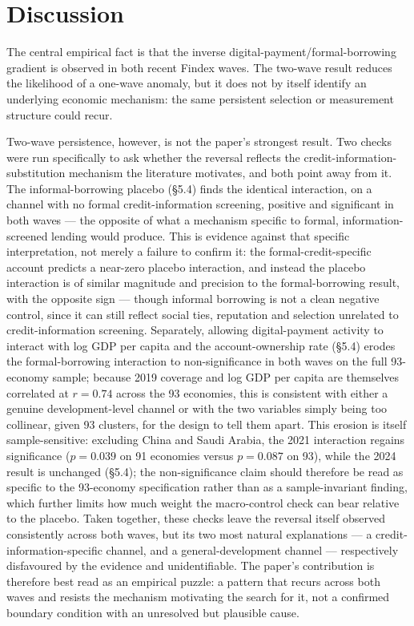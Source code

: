 

\section{Discussion}

The central empirical fact is that the inverse digital-payment/formal-borrowing gradient is
observed in both recent Findex waves. The two-wave result reduces the likelihood of a
one-wave anomaly, but it does not by itself identify an underlying economic mechanism: the
same persistent selection or measurement structure could recur.

Two-wave persistence, however, is not the paper's strongest result. Two checks were run
specifically to ask whether the reversal reflects the credit-information-substitution
mechanism the literature motivates, and both point away from it. The informal-borrowing
placebo (\S5.4) finds the identical interaction, on a channel with no formal
credit-information screening, positive and significant in both waves --- the opposite of
what a mechanism specific to formal, information-screened lending would produce. This is
evidence against that specific interpretation, not merely a failure to confirm it: the
formal-credit-specific account predicts a near-zero placebo interaction, and instead the
placebo interaction is of similar magnitude and precision to the formal-borrowing result,
with the opposite sign --- though informal borrowing is not a clean negative control, since
it can still reflect social ties, reputation and selection unrelated to credit-information
screening. Separately, allowing digital-payment
activity to interact with log GDP per capita and the account-ownership rate (\S5.4) erodes
the formal-borrowing interaction to non-significance in both waves on the full 93-economy
sample; because 2019 coverage and log GDP per capita are themselves correlated at $r=0.74$
across the 93 economies, this is consistent with either a genuine development-level
channel or with the two variables simply being too collinear, given 93 clusters, for the
design to tell them apart. This erosion is itself sample-sensitive: excluding China and
Saudi Arabia, the 2021 interaction regains significance ($p=0.039$ on 91 economies versus
$p=0.087$ on 93), while the 2024 result is unchanged (\S5.4); the non-significance claim
should therefore be read as specific to the 93-economy specification rather than as a
sample-invariant finding, which further limits how much weight the macro-control check can
bear relative to the placebo. Taken
together, these checks leave the reversal itself observed consistently across both waves,
but its two most natural explanations --- a credit-information-specific channel, and a
general-development channel --- respectively disfavoured by the evidence and unidentifiable.
The paper's contribution is therefore best read as an empirical puzzle: a pattern that
recurs across both waves and resists the mechanism motivating the search for it, not a
confirmed boundary condition with an unresolved but plausible cause.

